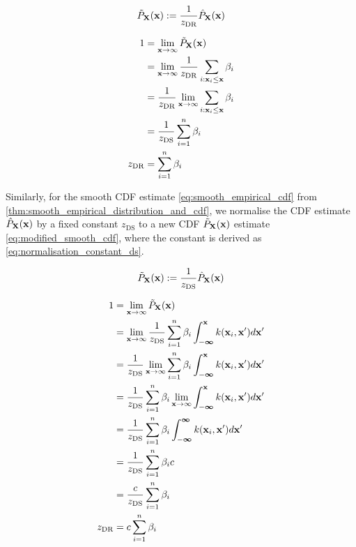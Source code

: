 \documentclass[twoside]{article} \usepackage{aistats2017}
\theoremstyle{definition}
\theoremstyle{theorem}
\newcommand{\rv}[1]{{#1}}
\begin{document}
		\begin{equation}
			\tilde{P}_{\bvec{\rv{X}}}(\bvec{x}) := \frac{1}{z_{\mathrm{DR}}} \hat{P}_{\bvec{\rv{X}}}(\bvec{x})
		\label{eq:modified_empirical_cdf}
		\end{equation}
		
		\begin{equation}
			\begin{aligned}
				1 &= \lim_{\bvec{x} \to \infty} \tilde{P}_{\bvec{\rv{X}}}(\bvec{x}) \\
				&= \lim_{\bvec{x} \to \infty} \frac{1}{z_{\mathrm{DR}}} \sum_{i : \bvec{x}_{i} \leq \bvec{x}} \beta_{i} \\
				&= \frac{1}{z_{\mathrm{DR}}} \lim_{\bvec{x} \to \infty} \sum_{i : \bvec{x}_{i} \leq \bvec{x}} \beta_{i} \\
				&= \frac{1}{z_{\mathrm{DS}}} \sum_{i = 1}^{n} \beta_{i} \\
				z_{\mathrm{DR}} &= \sum_{i = 1}^{n} \beta_{i}
			\end{aligned}
		\label{eq:normalisation_constant_dr}
		\end{equation}
		
		Similarly, for the smooth CDF estimate \eqref{eq:smooth_empirical_cdf} from \cref{thm:smooth_empirical_distribution_and_cdf}, we normalise the CDF estimate $\hat{P}_{\bvec{\rv{X}}}(\bvec{x})$ by a fixed constant $z_{\mathrm{DS}}$ to a new CDF $\tilde{P}_{\bvec{\rv{X}}}(\bvec{x})$ estimate \eqref{eq:modified_smooth_cdf}, where the constant is derived as \eqref{eq:normalisation_constant_ds}.
		
		\begin{equation}
			\tilde{P}_{\bvec{\rv{X}}}(\bvec{x}) := \frac{1}{z_{\mathrm{DS}}} \hat{P}_{\bvec{\rv{X}}}(\bvec{x})
		\label{eq:modified_smooth_cdf}
		\end{equation}
		
		\begin{equation}
			\begin{aligned}
				1 &= \lim_{\bvec{x} \to \infty} \tilde{P}_{\bvec{\rv{X}}}(\bvec{x}) \\
				&= \lim_{\bvec{x} \to \infty} \frac{1}{z_{\mathrm{DS}}} \sum_{i = 1}^{n} \beta_{i} \int_{-\bm{\infty}}^{\bvec{x}}  k(\bvec{x}_{i}, \bvec{x}') d\bvec{x}' \\
				&= \frac{1}{z_{\mathrm{DS}}} \lim_{\bvec{x} \to \infty} \sum_{i = 1}^{n} \beta_{i} \int_{-\bm{\infty}}^{\bvec{x}}  k(\bvec{x}_{i}, \bvec{x}') d\bvec{x}' \\
				&= \frac{1}{z_{\mathrm{DS}}} \sum_{i = 1}^{n} \beta_{i} \lim_{\bvec{x} \to \infty} \int_{-\bm{\infty}}^{\bvec{x}}  k(\bvec{x}_{i}, \bvec{x}') d\bvec{x}' \\
				&= \frac{1}{z_{\mathrm{DS}}} \sum_{i = 1}^{n} \beta_{i} \int_{-\bm{\infty}}^{\bm{\infty}}  k(\bvec{x}_{i}, \bvec{x}') d\bvec{x}' \\
				&= \frac{1}{z_{\mathrm{DS}}} \sum_{i = 1}^{n} \beta_{i} c \\
				&= \frac{c}{z_{\mathrm{DS}}} \sum_{i = 1}^{n} \beta_{i} \\
				z_{\mathrm{DR}} &= c \sum_{i = 1}^{n} \beta_{i}
			\end{aligned}
		\label{eq:normalisation_constant_ds}
		\end{equation}
		
\end{document}
